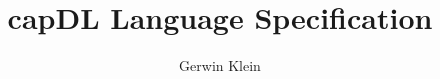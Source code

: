 \documentclass[a4paper,12pt]{article}
\begin{document}
\title{capDL Language Specification}
\author{Gerwin Klein}
\maketitle


\end{document}

